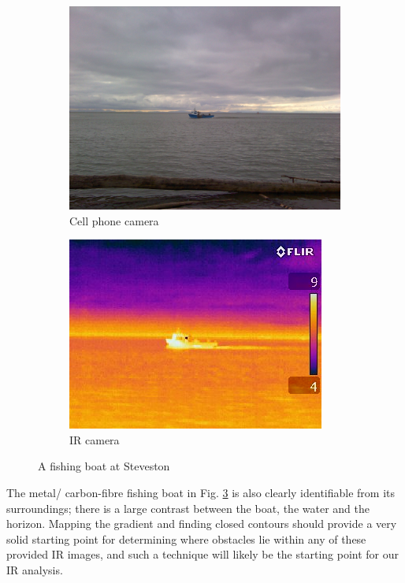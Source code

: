 \begin{figure}[H]
\centering
\begin{subfigure}{.5\textwidth}
  \centering
  \includegraphics[width=.8\linewidth]{"./image/steveston-noon-fishing-visible"}
  \caption{Cell phone camera}
  \label{fig:sub1}
\end{subfigure}%
\begin{subfigure}{.5\textwidth}
  \centering
  \includegraphics[width=.8\linewidth]{"./image/steveston-noon-fishing-ir"}
  \caption{IR camera}
  \label{fig:sub2}
\end{subfigure}
\caption{A fishing boat at Steveston }
\label{fig:IR comparison of a fishing boat in the afternoon}
\end{figure}

The metal/ carbon-fibre fishing boat in Fig. \ref{fig:IR comparison of a fishing boat in the afternoon} is also clearly identifiable from its surroundings; there is a large contrast between the boat, the water and the horizon. Mapping the gradient and finding closed contours should provide a very solid starting point for determining where obstacles lie within any of these provided IR images, and such a technique will likely be the starting point for our IR analysis. 

